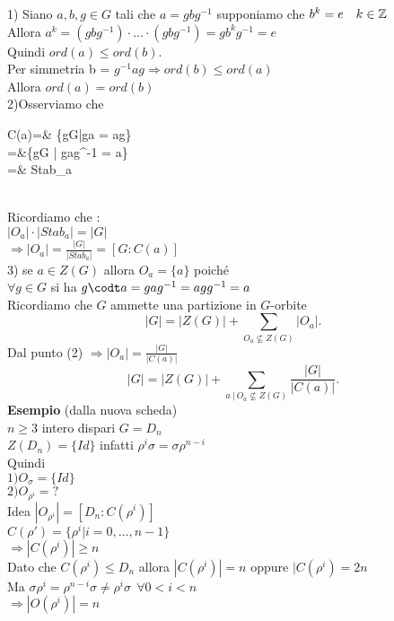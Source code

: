 \documentclass[12px]{article}
\begin{document}
	\begin{dimo}
		1) Siano $a,b,g\in G$ tali che  $a = gbg^{-1}$ supponiamo che  $b^k = e \ \ \ k\in\Z$\\
		Allora $a^k = (gbg^{-1})\cdot\ldots\cdot(gbg^{-1}) = gb^kg^{-1} = e$\\
		Quindi $ord(a)\leq ord(b)$.\\
		Per simmetria b =  $g^{-1}ag \Rightarrow ord(b)\leq ord(a)$ \\
		Allora $ord(a) = ord(b)$\\
		2)Osserviamo che \\
		\begin{aligned}
			C(a)=& \{g\in G|ga = ag\}\\
			=&\{g\in G | gag^{-1} = a\}\\
			=& Stab_a
		\end{aligned}\\
		Ricordiamo che :\\
		$|O_a|\cdot |Stab_a| = |G|$\\
		$ \Rightarrow |O_a| = \frac {|G|}{|Stab_a|} = [G : C(a)]$ \\
		3) se $a\in Z(G)$ allora  $O_a = \{a\}$ poiché\\
		$\forall g\in G$ si ha $g\codt a  = gag^{-1} = agg^{-1} = a$\\
		Ricordiamo che  $G$ ammette una partizione in $G$-orbite
		\[
		|G| = |Z(G)| + \sum_{O_a\not\subseteq Z(G)} |O_a|
		.\] 
		Dal punto (2) $ \Rightarrow  |O_a| = \frac{|G|}{|C(a)|}$ 
		\[
			|G| = |Z(G)| + \sum_{a \ | \ O_a\not\subseteq Z(G)}\frac{|G|}{|C(a)|}
		.\] 
		\textbf{Esempio} (dalla nuova scheda)\\
		$n\geq 3$ intero dispari  $G = D_n$\\
		$Z(D_n) = \{Id\}$ infatti  $\rho^i\sigma = \sigma \rho^{n-i}$\\
		Quindi\\
		$1) O_\sigma = \{Id\}$\\
		$2) O_{\rho^i} = ?$ \\
		Idea $|O_{\rho^i}| = [D_n : C(\rho^i)]$ \\
		$C(\rho') = \{\rho^i | i = 0,\ldots,n-1\}$ \\
		$ \Rightarrow |C(\rho^i)| \geq n$ \\
		Dato che $C(\rho^i)\leq D_n$ allora  $|C(\rho^i)| = n$ oppure  $|C(\rho^i) = 2n$\\
		Ma  $\sigma\rho^i = \rho^{n-i}\sigma\neq\rho^i\sigma \ \ \forall 0<i<n$\\
		 $ \Rightarrow |O(\rho^i)| = n$ \\

\end{dimo}
\end{document}
